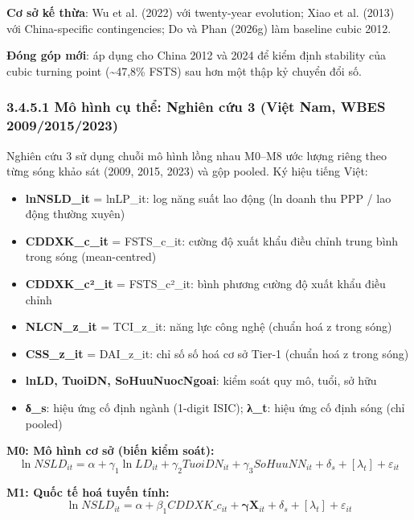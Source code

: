 \documentclass[12pt,a4paper]{article}
\providecommand{\tightlist}{\setlength{\itemsep}{0pt}\setlength{\parskip}{0pt}}
\begin{document}
\textbf{Cơ sở kế thừa}: Wu et al. (2022) với twenty-year evolution; Xiao
et al. (2013) với China-specific contingencies; Do và Phan (2026g) làm
baseline cubic 2012.

\textbf{Đóng góp mới}: áp dụng cho China 2012 và 2024 để kiểm định
stability của cubic turning point (\textasciitilde47,8\% FSTS) sau hơn
một thập kỷ chuyển đổi số.

\hypertarget{3451-muxf4-huxecnh-cux1ee5-thux1ec3-nghiuxean-cux1ee9u-3-viux1ec7t-nam-wbes-200920152023}{%
\subsubsection{3.4.5.1 Mô hình cụ thể: Nghiên cứu 3 (Việt Nam, WBES
2009/2015/2023)}\label{3451-muxf4-huxecnh-cux1ee5-thux1ec3-nghiuxean-cux1ee9u-3-viux1ec7t-nam-wbes-200920152023}}

Nghiên cứu 3 sử dụng chuỗi mô hình lồng nhau M0--M8 ước lượng riêng theo
từng sóng khảo sát (2009, 2015, 2023) và gộp pooled. Ký hiệu tiếng Việt:

\begin{itemize}
\tightlist
\item
  \textbf{lnNSLD\_it} = lnLP\_it: log năng suất lao động (ln doanh thu
  PPP / lao động thường xuyên)
\item
  \textbf{CDDXK\_c\_it} = FSTS\_c\_it: cường độ xuất khẩu điều chỉnh
  trung bình trong sóng (mean-centred)
\item
  \textbf{CDDXK\_c²\_it} = FSTS\_c²\_it: bình phương cường độ xuất khẩu
  điều chỉnh
\item
  \textbf{NLCN\_z\_it} = TCI\_z\_it: năng lực công nghệ (chuẩn hoá z
  trong sóng)
\item
  \textbf{CSS\_z\_it} = DAI\_z\_it: chỉ số số hoá cơ sở Tier-1 (chuẩn
  hoá z trong sóng)
\item
  \textbf{lnLD, TuoiDN, SoHuuNuocNgoai}: kiểm soát quy mô, tuổi, sở hữu
\item
  \textbf{δ\_s}: hiệu ứng cố định ngành (1-digit ISIC); \textbf{λ\_t}:
  hiệu ứng cố định sóng (chỉ pooled)
\end{itemize}

\textbf{M0: Mô hình cơ sở (biến kiểm soát):}
\[\ln NSLD_{it} = \alpha + \gamma_1 \ln LD_{it} + \gamma_2 TuoiDN_{it} + \gamma_3 SoHuuNN_{it} + \delta_s + [\lambda_t] + \varepsilon_{it}\]

\textbf{M1: Quốc tế hoá tuyến tính:}
\[\ln NSLD_{it} = \alpha + \beta_1 CDDXK\_c_{it} + \boldsymbol{\gamma}\mathbf{X}_{it} + \delta_s + [\lambda_t] + \varepsilon_{it}\]
\end{document}
